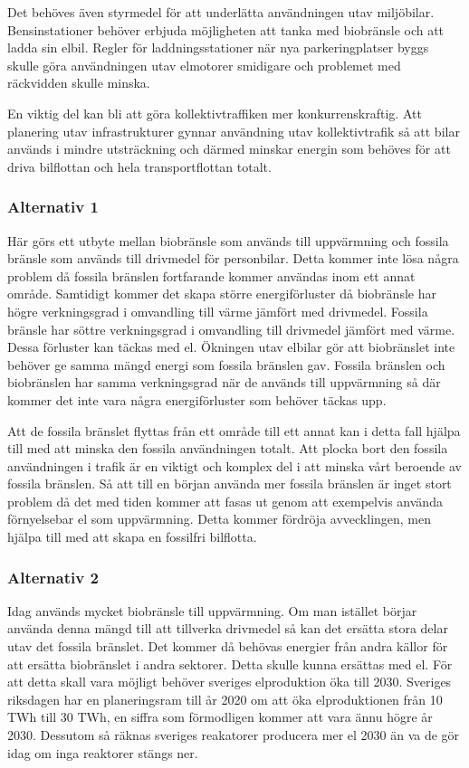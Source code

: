 \documentclass[a4paper,11pt,fleqn, titlepage]{article}
\begin{document}
Det behöves även styrmedel för att underlätta användningen utav miljöbilar. Bensinstationer behöver erbjuda möjligheten att tanka med biobränsle och att ladda sin elbil. Regler för laddningsstationer när nya parkeringplatser byggs skulle göra användningen utav elmotorer smidigare och problemet med räckvidden skulle minska.

En viktig del kan bli att göra kollektivtraffiken mer konkurrenskraftig. Att planering utav infrastrukturer gynnar användning utav kollektivtrafik så att bilar används i mindre utsträckning och därmed minskar energin som behöves för att driva bilflottan och hela transportflottan totalt.

\subsubsection{Alternativ 1}
Här görs ett utbyte mellan biobränsle som används till uppvärmning och fossila bränsle som används till drivmedel för personbilar. Detta kommer inte lösa några problem då fossila bränslen fortfarande kommer användas inom ett annat område. Samtidigt kommer det skapa större energiförluster då biobränsle har högre verkningsgrad i omvandling till värme jämfört med drivmedel. Fossila bränsle har söttre verkningsgrad i omvandling till drivmedel jämfört med värme. Dessa förluster kan täckas med el. Ökningen utav elbilar gör att biobränslet inte behöver ge samma mängd energi som fossila bränslen gav. Fossila bränslen och biobränslen har samma verkningsgrad när de används till uppvärmning så där kommer det inte vara några energiförluster som behöver täckas upp.

Att de fossila bränslet flyttas från ett område till ett annat kan i detta fall hjälpa till med att minska den fossila användningen totalt. Att plocka bort den fossila användningen i trafik är en viktigt och komplex del i att minska vårt beroende av fossila bränslen. Så att till en början använda mer fossila bränslen är inget stort problem då det med tiden kommer att fasas ut genom att exempelvis använda förnyelsebar el som uppvärmning. Detta kommer fördröja avvecklingen, men hjälpa till med att skapa en fossilfri bilflotta.

\subsubsection{Alternativ 2}

Idag används mycket biobränsle till uppvärmning. Om man istället börjar använda denna mängd till att tillverka drivmedel så kan det ersätta stora delar utav det fossila bränslet. Det kommer då behövas energier från andra källor för att ersätta biobränslet i andra sektorer. Detta skulle kunna ersättas med el. För att detta skall vara möjligt behöver sveriges elproduktion öka till 2030. Sveriges riksdagen har en planeringsram till år 2020 om att öka elproduktionen från 10 TWh till 30 TWh, en siffra som förmodligen kommer att vara ännu högre år 2030. Dessutom så räknas sveriges reakatorer producera mer el 2030 än va de gör idag om inga reaktorer stängs ner.
\end{document}
